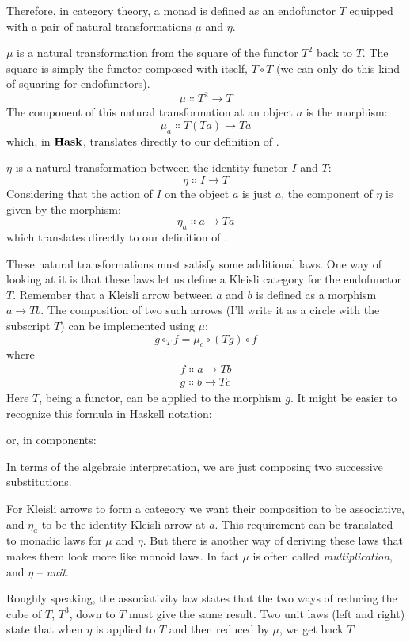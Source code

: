 Therefore, in category theory, a monad is defined as an endofunctor
$T$ equipped with a pair of natural transformations $\mu$ and $\eta$.

$\mu$ is a natural transformation from the square of the functor $T^2$
back to $T$. The square is simply the functor composed with
itself, $T \circ T$ (we can only do this kind of squaring for
endofunctors).
\[\mu \Colon T^2 \to T\]
The component of this natural transformation at an object $a$ is
the morphism:
\[\mu_a \Colon T (T a) \to T a\]
which, in $\mathbf{Hask}$, translates directly to our definition of
.

$\eta$ is a natural transformation between the identity functor $I$
and $T$:
\[\eta \Colon I \to T\]
Considering that the action of $I$ on the object $a$ is
just $a$, the component of $\eta$ is given by the morphism:
\[\eta_a \Colon a \to T a\]
which translates directly to our definition of .

These natural transformations must satisfy some additional laws. One way
of looking at it is that these laws let us define a Kleisli category for
the endofunctor $T$. Remember that a Kleisli arrow between
$a$ and $b$ is defined as a morphism
$a \to T b$. The composition of two such arrows
(I'll write it as a circle with the subscript $T$) can be
implemented using $\mu$:
\[g \circ_T f = \mu_c \circ (T g) \circ f\]
where
\begin{gather*}
  f \Colon a \to T b \\
  g \Colon b \to T c
\end{gather*}
Here $T$, being a functor, can be applied to the morphism
$g$. It might be easier to recognize this formula in Haskell
notation:

or, in components:

In terms of the algebraic interpretation, we are just composing two
successive substitutions.

For Kleisli arrows to form a category we want their composition to be
associative, and $\eta_a$ to be the identity Kleisli arrow at
$a$. This requirement can be translated to monadic laws for $\mu$ and
$\eta$. But there is another way of deriving these laws that makes them look
more like monoid laws. In fact $\mu$ is often called
\emph{multiplication}, and $\eta$ -- \emph{unit}.

Roughly speaking, the associativity law states that the two ways of
reducing the cube of $T$, $T^3$, down to $T$ must
give the same result. Two unit laws (left and right) state that when
$\eta$ is applied to $T$ and then reduced by $\mu$, we
get back $T$.

